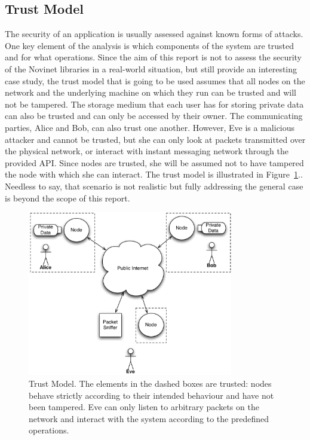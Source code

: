 \subsection{Trust Model}

The security of an application is usually assessed against known forms of attacks. One key element of the analysis is which components of the system are trusted and for what operations. Since the aim of this report is not to assess the security of the Novinet libraries in a real-world situation, but still provide an interesting case study, the trust model that is going to be used assumes that all nodes on the network and the underlying machine on which they run can be trusted and will not be tampered. The storage medium that each user has for storing private data can also be trusted and can only be accessed by their owner. The communicating parties, Alice and Bob, can also trust one another. However, Eve is a malicious attacker and cannot be trusted, but she can only look at packets transmitted over the physical network, or interact with instant messaging network through the provided API. Since nodes are trusted, she will be assumed not to have tampered the node with which she can interact. The trust model is illustrated in Figure~\ref{fig:TrustModel}.. Needless to say, that scenario is not realistic but fully addressing the general case is beyond the scope of this report. 

\begin{figure}[htb]
\begin{center}
\includegraphics[width=0.8\textwidth]{figures/TrustModel}
\caption[Trust Model]{\label{fig:TrustModel} Trust Model. The elements in the dashed boxes are trusted: nodes behave strictly according to their intended behaviour and have not been tampered. Eve can only listen to arbitrary packets on the network and interact with the system according to the predefined operations.}
\end{center}
\end{figure}

